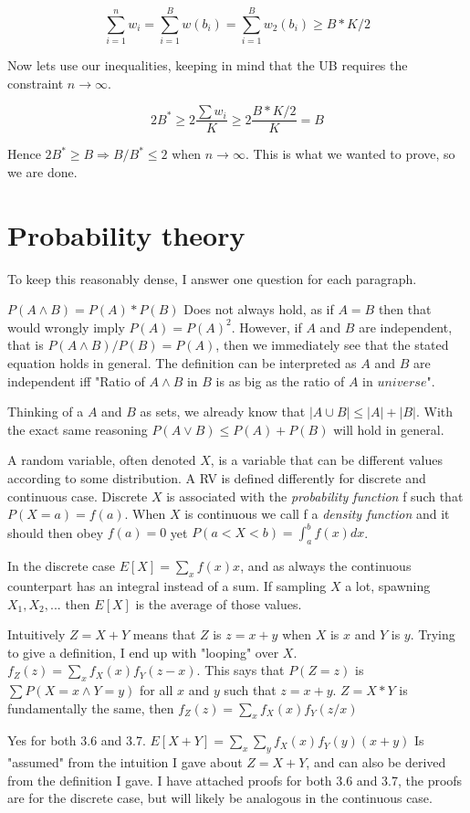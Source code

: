 \documentclass[a4paper,11pt]{article}
\begin{document}
\[
 \sum_{i=1}^{n} w_i = \sum_{i=1}^{B} w({b_i}) = \sum_{i=1}^{B} w_2({b_i}) \geq B*K/2
\]

Now lets use our inequalities, keeping in mind that the UB requires the
constraint $n \to \infty$.

\[
 2B^* \geq 2 \frac{\sum w_i}{K} \geq 2 \frac{B*K/2}{K} = B
\]

Hence $2B^* \geq B \Rightarrow B/B^* \leq 2 $ when $n \to \infty$.
This is what we wanted to prove, so we are done.


\section{Probability theory}
To keep this reasonably dense, I answer one question for each paragraph.

$P(A \wedge B) = P(A) * P(B)$ Does not always hold, as if $A=B$ then that would
wrongly imply $P(A) = P(A)^2$. However, if $A$ and $B$ are
independent, that is $P(A \wedge B)/P(B) = P(A)$, then we immediately see
that the stated equation holds in general. The definition can be interpreted
as $A$ and $B$ are independent iff
"Ratio of $A \wedge B$ in $B$ is as big as the ratio of $A$ in $universe$".

Thinking of a $A$ and $B$ as sets, we already know that 
$|A \cup B| \leq |A| + |B|$. With the exact same reasoning
$P(A \vee B) \leq P(A) + P(B)$ will hold in general.

A random variable, often denoted $X$, is a variable that can be
different values according to some distribution.
A RV is defined differently for discrete and continuous case.
Discrete $X$ is associated with the \emph{probability function} f
such that $P(X = a) = f(a)$. When $X$ is continuous we call f a
\emph{density function} and it should then obey $f(a) = 0$ yet
$P(a < X < b) = \int_a^b f(x)dx$.

In the discrete case $E[X] = \sum_x f(x)x$, and as always the continuous
counterpart has an integral instead of a sum. If sampling $X$ a lot,
spawning $X_1, X_2, ...$ then $E[X]$ is the average of those values.

Intuitively $Z = X + Y$ means that $Z$ is $z = x + y$ when
$X$ is $x$ and $Y$ is $y$. Trying to give a definition, I end up 
with "looping" over $X$.
$f_Z(z) = \sum_x f_X(x)f_Y(z-x)$. This says that $P(Z=z)$ is
$\sum P(X=x \wedge Y=y)$ for all $x$ and $y$ such that $z = x + y$.
$Z = X * Y$ is fundamentally the same, then
$f_Z(z) = \sum_x f_X(x)f_Y(z/x)$

Yes for both 3.6 and 3.7. $ E[X+Y] = \sum_x \sum_y f_X(x)f_Y(y)(x+y) $
Is "assumed" from the
intuition I gave about $Z = X + Y$, and can also be derived from
the definition I gave.
I have attached proofs for both 3.6 and 3.7, the proofs are for
the discrete case, but will likely be analogous in the continuous case.
\end{document}
